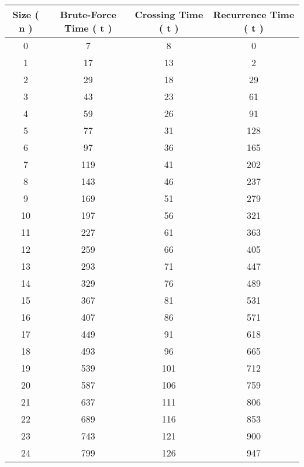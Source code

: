 \begin{center} 
\begin{tabular}[.5cm]{ c c c c } 
\toprule 
\hspace{10pt} Size ( n ) \hspace{10pt} & \hspace{10pt} Brute-Force Time ( t ) \hspace{10pt} & \hspace{10pt} Crossing Time ( t ) \hspace{10pt} & \hspace{10pt} Recurrence Time ( t ) \\ 
\midrule 
0 & 7 & 8 & 0 \\ 
\cmidrule {1-4} 
1 & 17 & 13 & 2 \\ 
\cmidrule {1-4} 
2 & 29 & 18 & 29 \\ 
\cmidrule {1-4} 
3 & 43 & 23 & 61 \\ 
\cmidrule {1-4} 
4 & 59 & 26 & 91 \\ 
\cmidrule {1-4} 
5 & 77 & 31 & 128 \\ 
\cmidrule {1-4} 
6 & 97 & 36 & 165 \\ 
\cmidrule {1-4} 
7 & 119 & 41 & 202 \\ 
\cmidrule {1-4} 
8 & 143 & 46 & 237 \\ 
\cmidrule {1-4} 
9 & 169 & 51 & 279 \\ 
\cmidrule {1-4} 
10 & 197 & 56 & 321 \\ 
\cmidrule {1-4} 
11 & 227 & 61 & 363 \\ 
\cmidrule {1-4} 
12 & 259 & 66 & 405 \\ 
\cmidrule {1-4} 
13 & 293 & 71 & 447 \\ 
\cmidrule {1-4} 
14 & 329 & 76 & 489 \\ 
\cmidrule {1-4} 
15 & 367 & 81 & 531 \\ 
\cmidrule {1-4} 
16 & 407 & 86 & 571 \\ 
\cmidrule {1-4} 
17 & 449 & 91 & 618 \\ 
\cmidrule {1-4} 
18 & 493 & 96 & 665 \\ 
\cmidrule {1-4} 
19 & 539 & 101 & 712 \\ 
\cmidrule {1-4} 
20 & 587 & 106 & 759 \\ 
\cmidrule {1-4} 
21 & 637 & 111 & 806 \\ 
\cmidrule {1-4} 
22 & 689 & 116 & 853 \\ 
\cmidrule {1-4} 
23 & 743 & 121 & 900 \\ 
\cmidrule {1-4} 
24 & 799 & 126 & 947 \\ 

\end{tabular}
\end{center}
